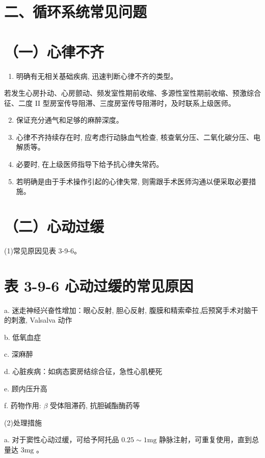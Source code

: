 \documentclass[10pt]{article}
\begin{document}
\section*{二、循环系统常见问题}
\section*{（一）心律不齐}
\begin{enumerate}
  \item 明确有无相关基础疾病, 迅速判断心律不齐的类型。
\end{enumerate}

若发生心房扑动、心房颤动、频发室性期前收缩、多源性室性期前收缩、预激综合征、二度 II 型房室传导阻滞、三度房室传导阻滞时，及时联系上级医师。

\begin{enumerate}
  \setcounter{enumi}{1}
  \item 保证充分通气和足够的麻醉深度。

  \item 心律不齐持续存在时, 应考虑行动脉血气检查, 核查氧分压、二氧化碳分压、电解质等。

  \item 必要时, 在上级医师指导下给予抗心律失常药。

  \item 若明确是由于手术操作引起的心律失常, 则需跟手术医师沟通以便采取必要措施。

\end{enumerate}

\section*{（二）心动过缓}
(1)常见原因见表 3-9-6。

\section*{表 3-9-6 心动过缓的常见原因}
a. 迷走神经兴奋性增加：眼心反射, 胆心反射, 腹膜和精索牵拉,后预窝手术对脑干的刺激, Valsalva 动作

b. 低氧血症

c. 深麻醉

d. 心脏疾病：如病态窦房结综合征，急性心肌梗死

e. 顾内压升高

f. 药物作用: $\beta$ 受体阻滞药, 抗胆碱酯酶药等

(2)处理措施

a. 对于窦性心动过缓，可给予阿托品 $0.25 \sim 1 \mathrm{mg}$ 静脉注射，可重复使用，直到总量达 $3 \mathrm{mg}$ 。
\end{document}
